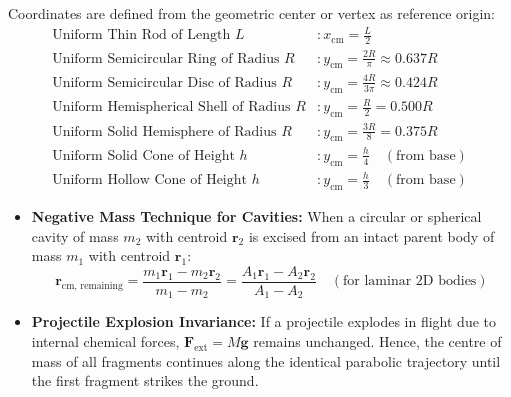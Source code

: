 \documentclass[10pt,a4paper]{article}
\begin{document}
\begin{formulabox}
Coordinates are defined from the geometric center or vertex as reference origin:
\begin{align}
  \text{Uniform Thin Rod of Length } L &: x_{\text{cm}} = \frac{L}{2} \\
  \text{Uniform Semicircular Ring of Radius } R &: y_{\text{cm}} = \frac{2R}{\pi} \approx 0.637 R \\
  \text{Uniform Semicircular Disc of Radius } R &: y_{\text{cm}} = \frac{4R}{3\pi} \approx 0.424 R \\
  \text{Uniform Hemispherical Shell of Radius } R &: y_{\text{cm}} = \frac{R}{2} = 0.500 R \\
  \text{Uniform Solid Hemisphere of Radius } R &: y_{\text{cm}} = \frac{3R}{8} = 0.375 R \\
  \text{Uniform Solid Cone of Height } h &: y_{\text{cm}} = \frac{h}{4} \quad (\text{from base}) \\
  \text{Uniform Hollow Cone of Height } h &: y_{\text{cm}} = \frac{h}{3} \quad (\text{from base})
\end{align}
\end{formulabox}

\begin{usecasebox}
\begin{itemize}
  \item \textbf{Negative Mass Technique for Cavities:} When a circular or spherical cavity of mass $m_2$ with centroid $\mathbf{r}_2$ is excised from an intact parent body of mass $m_1$ with centroid $\mathbf{r}_1$:
  \begin{equation}
    \mathbf{r}_{\text{cm, remaining}} = \frac{m_1 \mathbf{r}_1 - m_2 \mathbf{r}_2}{m_1 - m_2} = \frac{A_1 \mathbf{r}_1 - A_2 \mathbf{r}_2}{A_1 - A_2} \quad (\text{for laminar 2D bodies})
  \end{equation}
  \item \textbf{Projectile Explosion Invariance:} If a projectile explodes in flight due to internal chemical forces, $\mathbf{F}_{\text{ext}} = M\mathbf{g}$ remains unchanged. Hence, the centre of mass of all fragments continues along the identical parabolic trajectory until the first fragment strikes the ground.
\end{itemize}
\end{usecasebox}
\end{document}
